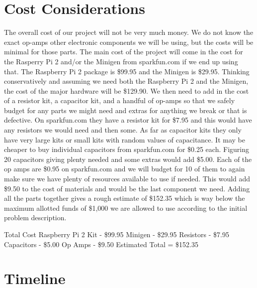 \documentclass{article}	%
\begin{document}
\begin{multicols}{2}
\section{Cost Considerations}
The overall cost of our project will not be very much money. We do not know the exact op-amps other electronic components we will be using, but the costs will be minimal for those parts. The main cost of the project will come in the cost for the Rasperry Pi 2 and/or the Minigen from sparkfun.com if we end up using that. The Raspberry Pi 2 package is \$99.95 and the Minigen is \$29.95. Thinking conservatively and assuming we need both the Raspberry Pi 2 and the Minigen, the cost of the major hardware will be \$129.90. We then need to add in the cost of a resistor kit, a capacitor kit, and a handful of op-amps so that we safely budget for any parts we might need and extras for anything we break or that is defective. On sparkfun.com they have a resistor kit for \$7.95 and this would have any resistors we would need and then some. As far as capacitor kits they only have very large kits or small kits with random values of capacitance. It may be cheaper to buy individual capacitors from sparkfun.com for \$0.25 each. Figuring 20 capacitors giving plenty needed and some extras would add \$5.00. Each of the op amps are \$0.95 on sparkfun.com and we will budget for 10 of them to again make sure we have plenty of resources available to use if needed. This would add \$9.50 to the cost of materials and would be the last component we need. Adding all the parts together gives a rough estimate of \$152.35 which is way below the maximum allotted funds of \$1,000 we are allowed to use according to the initial problem description.

Total Cost
Raspberry Pi 2 Kit - \$99.95
Minigen - \$29.95
Resistors - \$7.95
Capacitors - \$5.00
Op Amps - \$9.50
Estimated Total = \$152.35

\section{Timeline}







\end{multicols}
\end{document}
